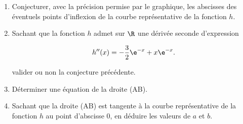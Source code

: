 \begin{enumerate}
\item Conjecturer, avec la précision permise par le graphique, les abscisses des éventuels points d'inflexion de la courbe représentative de la fonction $h$.
\item Sachant que la fonction $h$ admet sur $\R$ une dérivée seconde d'expression

\[h''(x) = - \dfrac32 \e^{- x} + x\e^{- x}.\]

valider ou non la conjecture précédente.
\item Déterminer une équation de la droite (AB).
\item Sachant que la droite (AB) est tangente à la courbe représentative de la fonction
$h$ au point d'abscisse 0, en déduire les valeurs de $a$ et $b$.
\end{enumerate}

\bigskip
